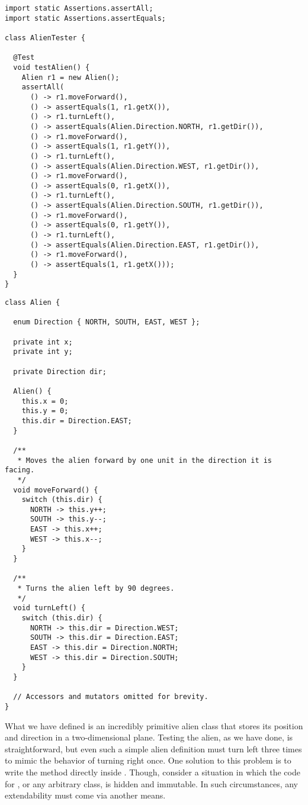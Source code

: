 \begin{lstlisting}[language=MyJava]
import static Assertions.assertAll;
import static Assertions.assertEquals;

class AlienTester {

  @Test
  void testAlien() {
    Alien r1 = new Alien();
    assertAll(
      () -> r1.moveForward(),
      () -> assertEquals(1, r1.getX()),
      () -> r1.turnLeft(),
      () -> assertEquals(Alien.Direction.NORTH, r1.getDir()),
      () -> r1.moveForward(),
      () -> assertEquals(1, r1.getY()),
      () -> r1.turnLeft(),
      () -> assertEquals(Alien.Direction.WEST, r1.getDir()),
      () -> r1.moveForward(),
      () -> assertEquals(0, r1.getX()),
      () -> r1.turnLeft(),
      () -> assertEquals(Alien.Direction.SOUTH, r1.getDir()),
      () -> r1.moveForward(),
      () -> assertEquals(0, r1.getY()),
      () -> r1.turnLeft(),
      () -> assertEquals(Alien.Direction.EAST, r1.getDir()),
      () -> r1.moveForward(),
      () -> assertEquals(1, r1.getX()));
  }
}
\end{lstlisting}

\begin{lstlisting}[language=MyJava]
class Alien {

  enum Direction { NORTH, SOUTH, EAST, WEST };

  private int x;
  private int y;

  private Direction dir;

  Alien() {
    this.x = 0;
    this.y = 0;
    this.dir = Direction.EAST;
  }

  /**
   * Moves the alien forward by one unit in the direction it is facing.
   */
  void moveForward() {
    switch (this.dir) {
      NORTH -> this.y++;
      SOUTH -> this.y--;
      EAST -> this.x++;
      WEST -> this.x--;
    }
  }

  /**
   * Turns the alien left by 90 degrees.
   */
  void turnLeft() {
    switch (this.dir) {
      NORTH -> this.dir = Direction.WEST;
      SOUTH -> this.dir = Direction.EAST;
      EAST -> this.dir = Direction.NORTH;
      WEST -> this.dir = Direction.SOUTH;
    }
  }

  // Accessors and mutators omitted for brevity.
}
\end{lstlisting}

What we have defined is an incredibly primitive alien class that stores its position and direction in a two-dimensional plane. Testing the alien, as we have done, is straightforward, but even such a simple alien definition must turn left three times to mimic the behavior of turning right once. One solution to this problem is to write the  method directly inside . Though, consider a situation in which the code for , or any arbitrary class, is hidden and immutable. In such circumstances, any extendability must come via another means. 

